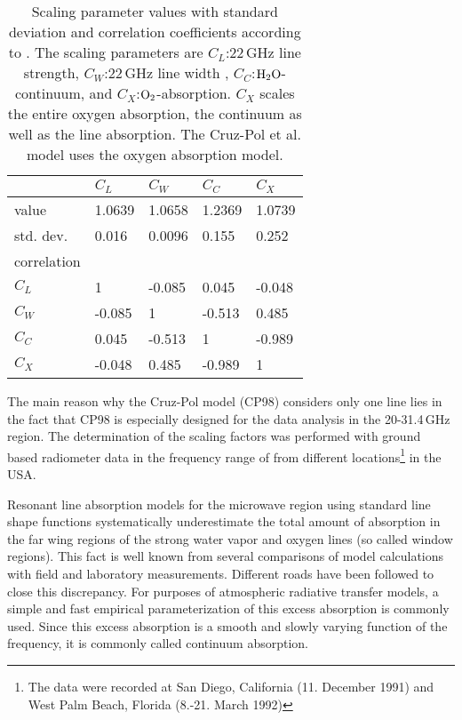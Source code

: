 {\begin{table}[!htb]
\begin{center}
\begin{tabular}{lllll}
\hline
            & $C_L$ & $C_W$ & $C_C$ & $C_X$ \\
\hline
value       & 1.0639 & 1.0658 & 1.2369 & 1.0739\\
std. dev.   & 0.016  & 0.0096 & 0.155  & 0.252\\
\hline
correlation & &&&\\
$C_L$       & 1      & -0.085 & 0.045  & -0.048\\
$C_W$       & -0.085 & 1      & -0.513 &  0.485\\
$C_C$       & 0.045  & -0.513 & 1      & -0.989\\
$C_X$       & -0.048 & 0.485  & -0.989 & 1\\
\hline
\end{tabular}
\end{center}
\caption{Scaling parameter values with standard deviation and 
  correlation coefficients according to \citep{cruzpol:98}.
  The scaling parameters are $C_L$:22\,GHz line strength, 
  $C_W$:22\,GHz line width , $C_C$:$\mbox{H}_2\mbox{O}$-continuum, and 
  $C_X$:$\mbox{O}_2$-absorption. $C_X$ scales the entire oxygen absorption, 
  the continuum as well as the line absorption. The Cruz-Pol et al.
  model uses the \cite{pwr:93} oxygen absorption model.}
\label{tab:cp_orr}
\end{table}

The main reason why the Cruz-Pol model (CP98) considers only one line
lies in the fact that CP98 is especially designed for the data analysis
in the 20-31.4\,GHz region. The determination of the scaling factors was 
performed with ground based radiometer data in the frequency range of
from different locations\footnote{The data were recorded at San Diego, 
California (11. December 1991) and West Palm Beach, Florida 
(8.-21. March 1992)} in the USA.


\label{levele:cp98_h2ocont}
Resonant line absorption models for the microwave region using
standard line shape functions systematically underestimate the total
amount of absorption in the far wing regions of the strong water vapor
and oxygen lines (so called window regions). This fact is well known
from several comparisons of model calculations with field and
laboratory measurements. Different roads have been followed to close
this discrepancy. For purposes of atmospheric radiative transfer
models, a simple and fast empirical parameterization of this excess
absorption is commonly used. Since this excess absorption is a smooth
and slowly varying function of the frequency, it is commonly called
continuum absorption.

}
